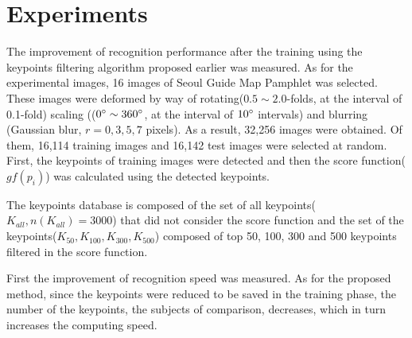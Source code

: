 

\section{Experiments}



The improvement of recognition performance after the training using the keypoints filtering algorithm proposed earlier was measured. As for the experimental images, 16 images of Seoul Guide Map Pamphlet was selected. These images were deformed by way of rotating($0.5\sim2.0$-folds, at the interval of 0.1-fold) scaling (($0\degree\sim360\degree$, at the interval of $10\degree$ intervals) and blurring (Gaussian blur, $r = 0,3,5,7$ pixels). As a result, 32,256 images were obtained. Of them, 16,114 training images and 16,142 test images were selected at random. First, the keypoints of training images were detected and then the score function($gf(p_i)$) was calculated using the detected keypoints. 


The keypoints database is composed of the set of all keypoints($K_{all}, n(K_{all}) = 3000$) that did not consider the score function and the set of the keypoints($K_{50}, K_{100}, K_{300}, K_{500}$) composed of top 50, 100, 300 and 500 keypoints filtered in the score function. 


First the improvement of recognition speed was measured. As for the proposed method, since the keypoints were reduced to be saved in the training phase, the number of the keypoints, the subjects of comparison, decreases, which in turn increases the computing speed. 

